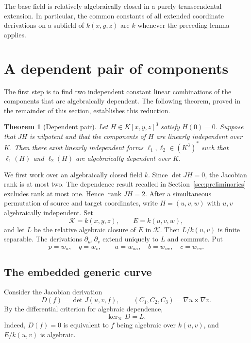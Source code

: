 \documentclass[11pt,reqno]{amsart}
\newtheorem{theorem}{Theorem}[section]
\theoremstyle{definition}
\theoremstyle{remark}
\numberwithin{equation}{section}
\DeclareMathOperator{\rank}{rank}
\begin{document}
The base field is relatively algebraically closed in a purely transcendental extension. In particular, the common constants of all extended coordinate derivations on a subfield of $k(x,y,z)$ are $k$ whenever the preceding lemma applies.

\section{A dependent pair of components}\label{sec:dependent-pair}

The first step is to find two independent constant linear combinations of the components that are algebraically dependent. The following theorem, proved in the remainder of this section, establishes this reduction.

\begin{theorem}[Dependent pair]\label{thm:dependent-pair}
Let $H\in K[x,y,z]^3$ satisfy $H(0)=0$. Suppose that $JH$ is nilpotent and that the components of $H$ are linearly independent over $K$. Then there exist linearly independent forms $\ell_1,\ell_2\in(K^3)^*$ such that $\ell_1(H)$ and $\ell_2(H)$ are algebraically dependent over $K$.
\end{theorem}

We first work over an algebraically closed field $k$. Since $\det JH=0$, the Jacobian rank is at most two. The dependence result recalled in Section~\ref{sec:preliminaries} excludes rank at most one. Hence $\rank JH=2$. After a simultaneous permutation of source and target coordinates, write $H=(u,v,w)$ with $u,v$ algebraically independent. Set
\[
 \mathcal K=k(x,y,z),\qquad E=k(u,v,w),
\]
and let $L$ be the relative algebraic closure of $E$ in $\mathcal K$. Then $L/k(u,v)$ is finite separable. The derivations $\partial_u,\partial_v$ extend uniquely to $L$ and commute. Put
\begin{equation}\label{eq:surface-derivatives}
 p=w_u,\quad q=w_v,\qquad a=w_{uu},\quad b=w_{uv},\quad c=w_{vv}.
\end{equation}

\subsection{The embedded generic curve}
Consider the Jacobian derivation
\[
 D(f)=\det J(u,v,f),\qquad (C_1,C_2,C_3)=\nabla u\times\nabla v.
\]
By the differential criterion for algebraic dependence,
\begin{equation}\label{eq:kernel-D}
 \ker_{\mathcal K}D=L.
\end{equation}
Indeed, $D(f)=0$ is equivalent to $f$ being algebraic over $k(u,v)$, and $E/k(u,v)$ is algebraic.
\end{document}
